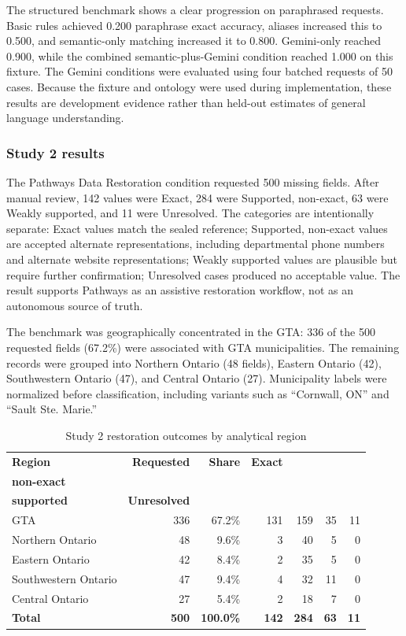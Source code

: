 \documentclass[12pt,oneside]{report}
\begin{document}
The structured benchmark shows a clear progression on paraphrased requests.
Basic rules achieved 0.200 paraphrase exact accuracy, aliases increased this
to 0.500, and semantic-only matching increased it to 0.800. Gemini-only
reached 0.900, while the combined semantic-plus-Gemini condition reached
1.000 on this fixture. The Gemini conditions were evaluated using four
batched requests of 50 cases. Because the fixture and ontology were used
during implementation, these results are development evidence rather than
held-out estimates of general language understanding.

\subsubsection{Study 2 results}
The Pathways Data Restoration condition requested 500 missing fields. After manual review, 142 values were Exact, 284 were Supported, non-exact, 63 were Weakly supported, and 11 were Unresolved. The categories are intentionally separate: Exact values match the sealed reference; Supported, non-exact values are accepted alternate representations, including departmental phone numbers and alternate website representations; Weakly supported values are plausible but require further confirmation; Unresolved cases produced no acceptable value. The result supports Pathways as an assistive restoration workflow, not as an autonomous source of truth.

The benchmark was geographically concentrated in the GTA: 336 of the 500 requested fields (67.2\%) were associated with GTA municipalities. The remaining records were grouped into Northern Ontario (48 fields), Eastern Ontario (42), Southwestern Ontario (47), and Central Ontario (27). Municipality labels were normalized before classification, including variants such as ``Cornwall, ON'' and ``Sault Ste. Marie.''

\begin{table}[H]
\caption{Study 2 restoration outcomes by analytical region}
\label{tab:study2_geography}
\centering
\small
\begin{tabularx}{\textwidth}{@{}Xrrrrrr@{}}
\toprule
\textbf{Region} & \textbf{Requested} & \textbf{Share} & \textbf{Exact} & \makecell{\textbf{Supported,}\\\textbf{non-exact}} & \makecell{\textbf{Weakly}\\\textbf{supported}} & \textbf{Unresolved} \\
\midrule
GTA & 336 & 67.2\% & 131 & 159 & 35 & 11 \\
Northern Ontario & 48 & 9.6\% & 3 & 40 & 5 & 0 \\
Eastern Ontario & 42 & 8.4\% & 2 & 35 & 5 & 0 \\
Southwestern Ontario & 47 & 9.4\% & 4 & 32 & 11 & 0 \\
Central Ontario & 27 & 5.4\% & 2 & 18 & 7 & 0 \\
\textbf{Total} & \textbf{500} & \textbf{100.0\%} & \textbf{142} & \textbf{284} & \textbf{63} & \textbf{11} \\
\bottomrule
\end{tabularx}
\end{table}
\end{document}
